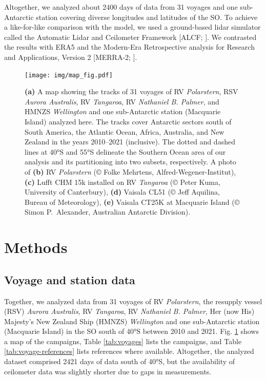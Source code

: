 \documentclass[draft]{agujournal2019}
\begin{document}
Altogether, we analyzed about 2400 days of data from 31 voyages and one sub-Antarctic station covering diverse longitudes and latitudes of the SO. To achieve a like-for-like comparison with the model, we used a ground-based lidar simulator called the Automatic Lidar and Ceilometer Framework [ALCF; ]. We contrasted the results with ERA5 \cite{era5} and the Modern-Era Retrospective analysis for Research and Applications, Version 2 [MERRA-2; ].

\begin{figure}[b!]
\centering
\texttt{[image: img/map\_fig.pdf]}
\caption{
\textbf{(a)} A map showing the tracks of 31 voyages of RV \emph{Polarstern}, RSV \emph{Aurora Australis}, RV \emph{Tangaroa}, RV \emph{Nathaniel B. Palmer}, and HMNZS \emph{Wellington} and one sub-Antarctic station (Macquarie Island) analyzed here. The tracks cover Antarctic sectors south of South America, the Atlantic Ocean, Africa, Australia, and New Zealand in the years 2010--2021 (inclusive). The dotted and dashed lines at 40°S and 55°S delineate the Southern Ocean area of our analysis and its partitioning into two subsets, respectively. A photo of \textbf{(b)} RV \emph{Polarstern} (© Folke Mehrtens, Alfred-Wegener-Institut), \textbf{(c)} Lufft CHM 15k installed on RV \emph{Tangaroa} (© Peter Kuma, University of Canterbury), \textbf{(d)} Vaisala CL51 (© Jeff Aquilina, Bureau of Meteorology), \textbf{(e)} Vaisala CT25K at Macquarie Island (© Simon P.\ Alexander, Australian Antarctic Division).
}
\label{fig:map}
\end{figure}

\section{Methods}
\label{sec:methods}

\subsection{Voyage and station data}

Together, we analyzed data from 31 voyages of RV \emph{Polarstern}, the resupply vessel (RSV) \emph{Aurora Australis}, RV \emph{Tangaroa}, RV \emph{Nathaniel B. Palmer}, Her (now His) Majesty's New Zealand Ship (HMNZS) \emph{Wellington} and one sub-Antarctic station (Macquarie Island) in the SO south of 40°S between 2010 and 2021. Fig. \ref{fig:map} shows a map of the campaigns, Table \ref{tab:voyages} lists the campaigns, and Table \ref{tab:voyage-references} lists references where available. Altogether, the analyzed dataset comprised 2421 days of data south of 40°S, but the availability of ceilometer data was slightly shorter due to gaps in measurements.
\end{document}

